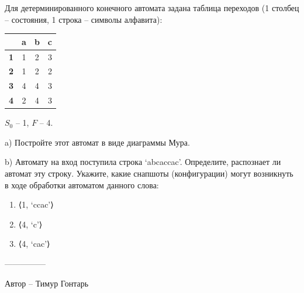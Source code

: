 \question
Для детерминированного конечного автомата задана таблица переходов (1 столбец – состояния, 1 строка – символы алфавита):

\begin{tabular}{||c | c |c| c||} 
 \hline
 & \textbf{a} & \textbf{b} & \textbf{c} \\ 
 \hline\hline
 \textbf{1} & 1& 2& 3\\ 
 \hline
 \textbf{2} & 1& 2& 2\\
 \hline
 \textbf{3} & 4& 4& 3\\
 \hline
 \textbf{4} & 2 & 4& 3\\
 \hline
\end{tabular}

$S_0$ – 1, $F$ – {4}.

a) Постройте этот автомат в виде диаграммы Мура.

b) Автомату на вход поступила строка ‘abcaccac’. Определите, распознает ли автомат эту строку. Укажите, какие снапшоты (конфигурации) могут возникнуть в ходе обработки автоматом данного слова:

\begin{enumerate}
    \item ⟨1, ‘ccac’⟩
    \item ⟨4, ‘c’⟩
    \item ⟨4, ‘cac’⟩
\end{enumerate}

---------------

Автор -- Тимур Гонтарь

